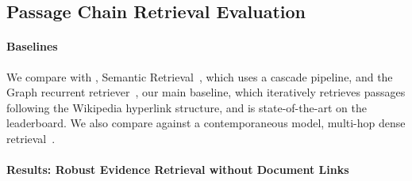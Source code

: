 \subsection{Passage Chain Retrieval Evaluation}

\paragraph{Baselines}
We compare \name{} with , Semantic
Retrieval~\cite[]{nie2019revealing}, which uses a cascade \bert{}
pipeline, and the Graph recurrent
retriever~\cite[\grr{}]{asai2020learning}, our main baseline, which
iteratively retrieves passages following the Wikipedia hyperlink
structure, and is state-of-the-art on the leaderboard.
%
We also compare against a contemporaneous model, multi-hop dense
retrieval~\cite[]{xiong2020answering}.

  
%
  
   
 
  


\paragraph{Results: Robust Evidence Retrieval without Document Links}

